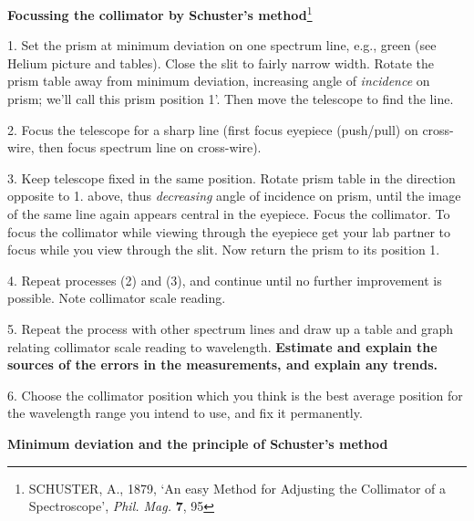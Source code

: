 \documentclass[12pt]{article}
\begin{document}
{\large {\bf Focussing the collimator by Schuster's method}\footnote{
SCHUSTER, A., 1879, `An easy Method for Adjusting the Collimator of
a Spectroscope',  {\sl Phil. Mag.} {\bf 7}, 95} }

 1. Set the prism at minimum deviation on one spectrum line, e.g., green
(see Helium picture and tables).  Close the slit to fairly narrow width.
Rotate the prism table away from minimum deviation, increasing angle of
{\em incidence} on  prism; we'll call this prism position 1'. 
Then move the telescope to find the line.

2. Focus the telescope for a sharp line (first focus eyepiece (push/pull) on 
cross-wire, then  focus spectrum line on cross-wire).

3. Keep telescope fixed in the same position. Rotate prism table in the 
direction opposite to 1. above, thus {\em decreasing\/} angle
of incidence on  prism, until the image of the same line again appears
central in the eyepiece.  Focus the
collimator.  To focus the collimator while viewing through the
eyepiece get your lab partner to focus while you view through
the slit. Now return the prism to its position 1. 

4. Repeat processes (2) and (3), and continue until no further
improvement is possible.   Note collimator scale reading.

5. Repeat the process with other spectrum lines and draw up a table
and graph relating collimator scale reading to wavelength. {\bf Estimate and 
explain the sources of the errors in the measurements, and explain any trends.}

6. Choose the collimator position which you think is the best average
position for the  wavelength range you intend to use, and fix it
permanently.
\newpage

\begin{center}
{\large {\bf Minimum deviation and the principle of Schuster's method}}
\end{center}
\centerline{}
\end{document}
